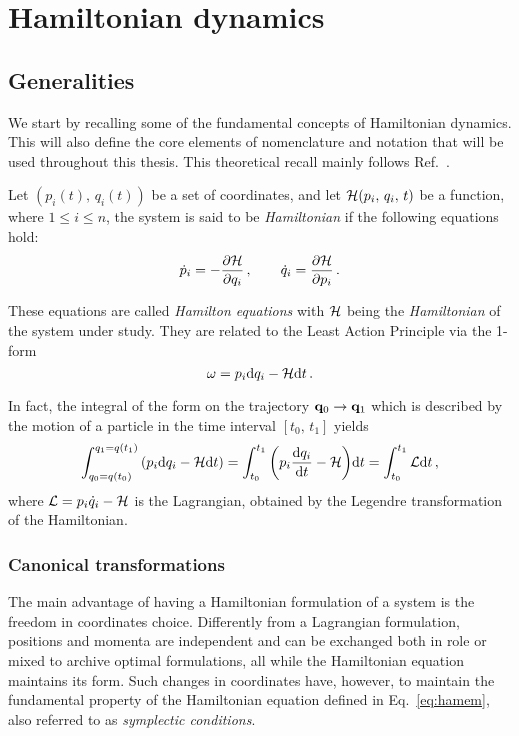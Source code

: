 
\chapter{Hamiltonian dynamics}\label{ch:mathematical_elements}

\section{Generalities}\label{sec:1:hamiltonian}

We start by recalling some of the fundamental concepts of Hamiltonian dynamics. This will also define the core elements of nomenclature and notation that will be used throughout this thesis. This theoretical recall mainly follows Ref.~\cite{Arnold:937549}.

Let $(p_i(t),\,q_i(t))$ be a set of coordinates, and let $\mathcal{H}(p_i,\, q_i,\, t)$ be a function, where $1\le i \le n$, the system is said to be \textit{Hamiltonian} if the following equations hold:
%
\begin{equation} 
		\dot p_i = -\pdv{\mathcal{H}}{q_i}\,,\qquad 		\dot q_i = \pdv{\mathcal{H}}{p_i} \, .
	\label{hameq}
 \end{equation} 

These equations are called \textit{Hamilton equations} with $\mathcal{H}$ being the \textit{Hamiltonian} of the system under study. They are related to the Least Action Principle via the 1-form
%
\begin{equation} \omega = p_i \dd q_i -\mathcal{H} \dd t \, .  \end{equation}

In fact, the integral of the form on the trajectory $\vb{q}_0\to \vb{q}_1$ which is described by the motion of a particle in the time interval $[t_0,\,t_1]$ yields
\begin{equation}
    \int_{q_0=q(t_0)}^{q_1=q(t_1)} \qty(p_i \dd q_i - \mathcal{H} \dd t) = \int_{t_0}^{t_1} \qty(p_i \dv{q_i}{t} - \mathcal{H})\dd t =  \int_{t_0}^{t_1} \mathcal{L} \dd t\,, 
\end{equation}
where $\mathcal{L}=p_i\dot q_i - \mathcal{H}$ is the Lagrangian, obtained by the Legendre transformation of the Hamiltonian. 

\subsection{Canonical transformations}

The main advantage of having a Hamiltonian formulation of a system is the freedom in coordinates choice. Differently from a Lagrangian formulation, positions and momenta are independent and can be exchanged both in role or mixed to archive optimal formulations, all while the Hamiltonian equation maintains its form. Such changes in coordinates have, however, to maintain the fundamental property of the Hamiltonian equation defined in Eq.~\eqref{eq:hamem}, also referred to as \textit{symplectic conditions}.

